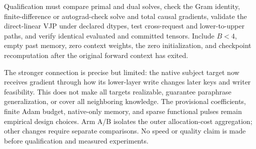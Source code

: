 \documentclass[10pt]{article}
\begin{document}
Qualification must compare primal and dual solves, check the Gram
identity, finite-difference or autograd-check solve and total causal
gradients, validate the direct-linear VJP under declared dtypes, test
cross-request and lower-to-upper paths, and verify identical evaluated
and committed tensors. Include $B<4$, empty past memory, zero context
weights, the zero initialization, and checkpoint recomputation after
the original forward context has exited.

The stronger connection is precise but limited: the native subject target
now receives gradient through how its lower-layer write changes later
keys and writer feasibility. This does not make all targets realizable,
guarantee paraphrase generalization, or cover all neighboring knowledge.
The provisional coefficients, finite Adam budget, native-only memory,
and sparse functional pulses remain empirical design choices. Arm A/B
isolates the outer allocation-cost aggregation; other changes require
separate comparisons. No speed or quality claim is made before
qualification and measured experiments.
\end{document}
